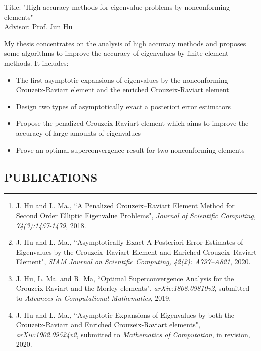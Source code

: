 \documentclass[10pt,a4]{article}
\begin{document}
\begin{small}
\begin{list}{}{}
\item Title: "High accuracy methods for eigenvalue problems by nonconforming elements"  \\
Advisor: Prof. Jun Hu
\item My thesis concentrates on the analysis of high accuracy methods and proposes some algorithms to improve the accuracy of eigenvalues by finite element methods.  It includes:
\begin{itemize}
\item The first asymptotic expansions of eigenvalues by the nonconforming Crouzeix-Raviart element and the enriched Crouzeix-Raviart element 
\item Design two types of asymptotically exact a posteriori error estimators
\item Propose the penalized Crouzeix-Raviart element which aims to improve the accuracy of large amounts of eigenvalues
\item Prove an optimal superconvergence result for two nonconforming elements
\end{itemize}
\end{list}

 
\subsection*{PUBLICATIONS}
\hrule
\vspace{0.2cm} 
\begin{enumerate}
    	\item J. Hu and L. Ma., ``A Penalized Crouzeix--Raviart Element Method for Second Order Elliptic Eigenvalue Problems",  {\it Journal of Scientific Computing, 74(3):1457-1479}, 2018.
	
	\item J. Hu and L. Ma., ``Asymptotically Exact A Posteriori Error Estimates of Eigenvalues by the Crouzeix--Raviart Element and Enriched Crouzeix--Raviart Element",  {\it SIAM Journal on Scientific Computing, 42(2): A797--A821}, 2020.
	
	
	\item J. Hu, L. Ma. and R. Ma, ``Optimal Superconvergence Analysis for the Crouzeix-Raviart and the Morley elements",  {\it arXiv:1808.09810v2}, submitted to {\it Advances in Computational Mathematics}, 2019.

	\item J. Hu and L. Ma., ``Asymptotic Expansions of Eigenvalues by both the Crouzeix-Raviart and Enriched Crouzeix-Raviart elements",  {\it arXiv:1902.09524v2}, submitted to {\it Mathematics of Computation}, in revision, 2020.



\end{enumerate}
\end{small}
\end{document}
